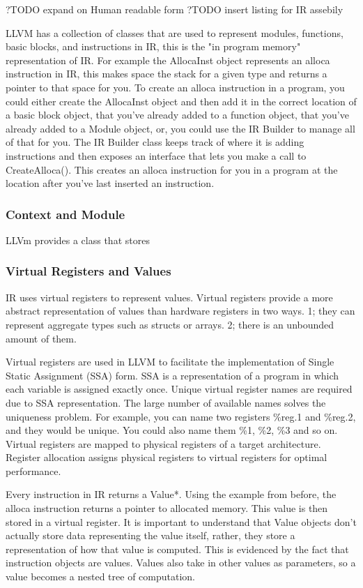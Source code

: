 \documentclass[hidelinks,12pt]{article}
\begin{document}
\begin{doublespacing}
?TODO expand on Human readable form 
?TODO insert listing for IR assebily

LLVM has a collection of classes that are used to represent modules, functions, basic blocks, and instructions in IR, this is the "in program memory" representation of IR. For example the AllocaInst object represents an alloca instruction in IR, this makes space the stack for a given type and returns a pointer to that space for you. To create an alloca instruction in a program, you could either create the AllocaInst object and then add it in the correct location of a basic block object, that you've already added to a function object, that you've already added to a Module object, or, you could use the IR Builder to manage all of that for you. The IR Builder class keeps track of where it is adding instructions and then exposes an interface that lets you make a call to CreateAlloca(). This creates an alloca instruction for you in a program at the location after you've last inserted an instruction.

\subsubsection*{Context and Module}

LLVm provides a class that stores 

\subsubsection*{Virtual Registers and Values}
IR uses virtual registers to represent values. Virtual registers provide a more abstract representation of values than hardware registers in two ways. 1; they can represent aggregate types such as structs or arrays. 2; there is an unbounded amount of them. 

Virtual registers are used in LLVM to facilitate the implementation of Single Static Assignment (SSA) form. SSA is a representation of a program in which each variable is assigned exactly once. Unique virtual register names are required due to SSA representation. The large number of available names solves the uniqueness problem. For example, you can name two registers \%reg.1 and \%reg.2, and they would be unique. You could also name them \%1, \%2, \%3 and so on. Virtual registers are mapped to physical registers of a target architecture. Register allocation assigns physical registers to virtual registers for optimal performance.

Every instruction in IR returns a Value*. Using the example from before, the alloca instruction returns a pointer to allocated memory. This value is then stored in a virtual register. It is important to understand that Value objects don't actually store data representing the value itself, rather, they store a representation of how that value is computed. This is evidenced by the fact that instruction objects are values. Values also take in other values as parameters, so a value becomes a nested tree of computation.
\cite{lattner_llvm_2004}

\end{doublespacing}
\end{document}
